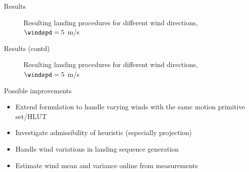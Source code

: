 \documentclass{beamer}
\begin{document}
\begin{frame}{Results}
    \begin{figure}
    
        \caption{Resulting landing procedures for different wind directions, $\windspd=5$ m/s}
        \label{fig:result}
    \end{figure}
\end{frame}

\begin{frame}{Results (contd)}
    \begin{figure}
    
        \caption{Resulting landing procedures for different wind directions, $\windspd=5$ m/s}
        \label{fig:result}
    \end{figure}
\end{frame}

\begin{frame}{Possible improvements}

\begin{itemize}
    \item Extend formulation to handle varying winds with the same motion primitive set/HLUT 
    \item Investigate admissibility of heuristic (especially projection)
    \item Handle wind variations in landing sequence generation
    \item Estimate wind mean and variance online from measurements
\end{itemize}
    
\end{frame}
\end{document}
